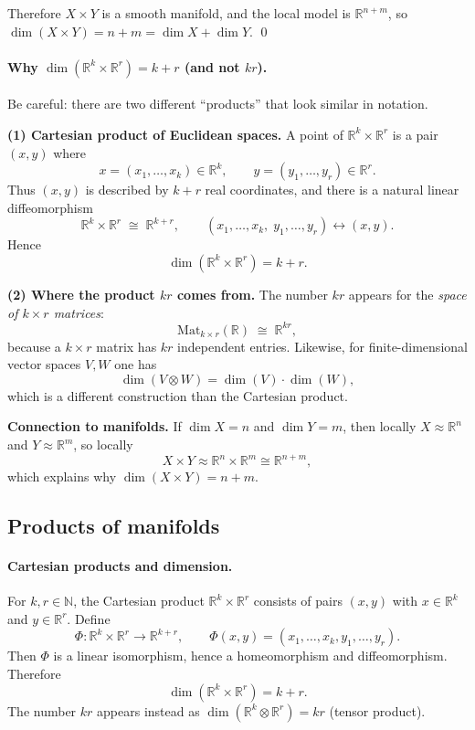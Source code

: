 \documentclass[12pt,a4paper]{article}
\newcommand{\R}{\mathbb{R}}
\theoremstyle{plain}
\theoremstyle{definition}      %
\begin{document}
Therefore $X\times Y$ is a smooth manifold, and the local model is
$\mathbb{R}^{n+m}$, so $\dim(X\times Y)=n+m=\dim X+\dim Y$.
\qed

\paragraph{Why $\dim(\mathbb{R}^k\times\mathbb{R}^r)=k+r$ (and not $kr$).}
Be careful: there are two different ``products'' that look similar in notation.

\medskip
\noindent\textbf{(1) Cartesian product of Euclidean spaces.}
A point of $\mathbb{R}^k\times\mathbb{R}^r$ is a pair $(x,y)$ where
\[
x=(x_1,\dots,x_k)\in\mathbb{R}^k,\qquad y=(y_1,\dots,y_r)\in\mathbb{R}^r.
\]
Thus $(x,y)$ is described by $k+r$ real coordinates, and there is a natural
linear diffeomorphism
\[
\mathbb{R}^k\times\mathbb{R}^r \;\cong\; \mathbb{R}^{k+r},
\qquad
(x_1,\dots,x_k,\;y_1,\dots,y_r)\longleftrightarrow (x,y).
\]
Hence
\[
\dim(\mathbb{R}^k\times\mathbb{R}^r)=k+r.
\]

\medskip
\noindent\textbf{(2) Where the product $kr$ comes from.}
The number $kr$ appears for the \emph{space of $k\times r$ matrices}:
\[
\mathrm{Mat}_{k\times r}(\mathbb{R}) \;\cong\; \mathbb{R}^{kr},
\]
because a $k\times r$ matrix has $kr$ independent entries.
Likewise, for finite-dimensional vector spaces $V,W$ one has
\[
\dim(V\otimes W)=\dim(V)\cdot\dim(W),
\]
which is a different construction than the Cartesian product.

\medskip
\noindent\textbf{Connection to manifolds.}
If $\dim X=n$ and $\dim Y=m$, then locally $X\approx\mathbb{R}^n$ and
$Y\approx\mathbb{R}^m$, so locally
\[
X\times Y \approx \mathbb{R}^n\times\mathbb{R}^m \cong \mathbb{R}^{n+m},
\]
which explains why $\dim(X\times Y)=n+m$.

\subsection*{Products of manifolds}

\paragraph{Cartesian products and dimension.}
For $k,r\in\mathbb N$, the Cartesian product $\R^k\times \R^r$ consists of pairs $(x,y)$
with $x\in\R^k$ and $y\in\R^r$. Define
\[
\Phi:\R^k\times\R^r \to \R^{k+r},\qquad
\Phi(x,y)=(x_1,\dots,x_k,y_1,\dots,y_r).
\]
Then $\Phi$ is a linear isomorphism, hence a homeomorphism and diffeomorphism.
Therefore
\[
\dim(\R^k\times\R^r)=k+r.
\]
The number $kr$ appears instead as $\dim(\R^k\otimes \R^r)=kr$ (tensor product).
\end{document}
